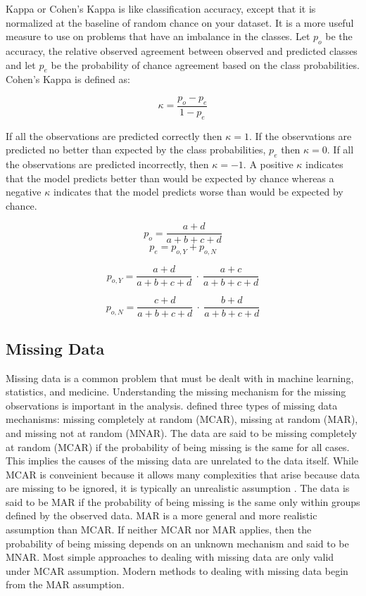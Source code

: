 \documentclass[12pt,]{article}
\begin{document}
Kappa or Cohen's Kappa is like classification accuracy, except that it
is normalized at the baseline of random chance on your dataset. It is a
more useful measure to use on problems that have an imbalance in the
classes. Let \(p_o\) be the accuracy, the relative observed agreement
between observed and predicted classes and let \(p_e\) be the
probability of chance agreement based on the class probabilities.
Cohen's Kappa is defined as:

\[
\kappa = \frac{p_o - p_e}{1 - p_e}
\]

If all the observations are predicted correctly then \(\kappa=1\). If
the observations are predicted no better than expected by the class
probabilities, \(p_e\) then \(\kappa=0\). If all the observations are
predicted incorrectly, then \(\kappa=-1\). A positive \(\kappa\)
indicates that the model predicts better than would be expected by
chance whereas a negative \(\kappa\) indicates that the model predicts
worse than would be expected by chance.

\[
p_o = \frac{a+d}{a+b+c+d}
\] \[
p_e = p_{o,Y} + p_{o,N} 
\]

\[
p_{o,Y} = \frac{a+d}{a+b+c+d} ~\cdot~ \frac{a+c}{a+b+c+d}
\]

\[
p_{o,N} = \frac{c+d}{a+b+c+d} ~\cdot~ \frac{b+d}{a+b+c+d}
\]

\subsection{Missing Data}\label{missing-data}

Missing data is a common problem that must be dealt with in machine
learning, statistics, and medicine. Understanding the missing mechanism
for the missing observations is important in the analysis.
\citep{rubin_inference_1976} defined three types of missing data
mechanisms: missing completely at random (MCAR), missing at random
(MAR), and missing not at random (MNAR). The data are said to be missing
completely at random (MCAR) if the probability of being missing is the
same for all cases. This implies the causes of the missing data are
unrelated to the data itself. While MCAR is conveinient because it
allows many complexities that arise because data are missing to be
ignored, it is typically an unrealistic assumption
\citep{van_buuren_flexible_2012}. The data is said to be MAR if the
probability of being missing is the same only within groups defined by
the observed data. MAR is a more general and more realistic assumption
than MCAR. If neither MCAR nor MAR applies, then the probability of
being missing depends on an unknown mechanism and said to be MNAR. Most
simple approaches to dealing with missing data are only valid under MCAR
assumption. Modern methods to dealing with missing data begin from the
MAR assumption.
\end{document}
